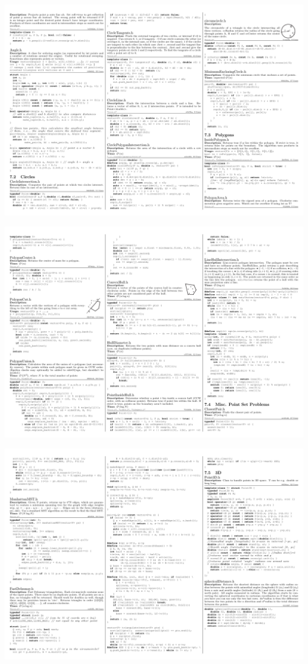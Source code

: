 \documentclass[10pt]{article}
\begin{document}
\begin{landscape}
\centerline{\includegraphics[scale=0.95]{kactl/kactl-6.pdf}}
\centerline{\includegraphics[scale=0.95]{kactl/kactl-7.pdf}}
\centerline{\includegraphics[scale=0.95]{kactl/kactl-8.pdf}}
\end{landscape}
\end{document}
